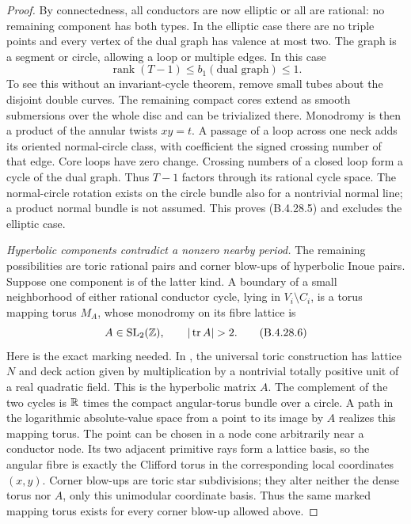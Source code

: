 \begin{proof}
By connectedness, all conductors are now elliptic or
all are rational: no remaining component has both
types. In the elliptic case there are no triple points
and every vertex of the dual graph has valence at most
two. The graph is a segment or circle, allowing a loop
or multiple edges. In this case
\[
 \operatorname{rank}(T-1)\le b_1(\text{dual graph})
 \le1.                                               \tag{B.4.28.5}
\]
To see this without an invariant-cycle theorem, remove
small tubes about the disjoint double curves. The
remaining compact cores extend as smooth submersions
over the whole disc and can be trivialized there.
Monodromy is then a product of the annular twists
$xy=t$. A passage of a loop across one neck adds its
oriented normal-circle class, with coefficient the
signed crossing number of that edge. Core loops have
zero change. Crossing numbers of a closed loop form a
cycle of the dual graph. Thus $T-1$ factors through its
rational cycle space. The normal-circle rotation exists
on the circle bundle also for a nontrivial normal line;
a product normal bundle is not assumed. This proves
(B.4.28.5) and excludes the elliptic case.

\emph{Hyperbolic components contradict a nonzero nearby period.}
The remaining possibilities are toric rational pairs
and corner blow-ups of hyperbolic Inoue pairs. Suppose
one component is of the latter kind. A boundary of a
small neighborhood of either rational conductor cycle,
lying in $V_i\setminus C_i$, is a torus mapping torus
$M_A$, whose monodromy on its fibre lattice is
\[
 A\in\operatorname{SL}_2(\Z),\qquad
 |\operatorname{tr}A|>2.                             \tag{B.4.28.6}
\]
Here is the exact marking needed. In
\citet[Section 15, Theorem 15.1 and the following
paragraph, pp.~130--131]{Oda1978D}, the universal
toric construction has lattice $N$ and deck action
given by multiplication by a nontrivial totally
positive unit of a real quadratic field. This is
the hyperbolic matrix $A$. The complement of the
two cycles is $\mathbb R$ times the compact angular-torus
bundle over a circle. A path in the logarithmic
absolute-value space from a point to its image by
$A$ realizes this mapping torus. The point can be
chosen in a node cone arbitrarily near a conductor
node. Its two adjacent primitive rays form a lattice
basis, so the angular fibre is exactly the Clifford
torus in the corresponding local coordinates
$(x,y)$. Corner blow-ups are toric star subdivisions;
they alter neither the dense torus nor $A$, only
this unimodular coordinate basis. Thus the same
marked mapping torus exists for every corner
blow-up allowed above.


\end{proof}
